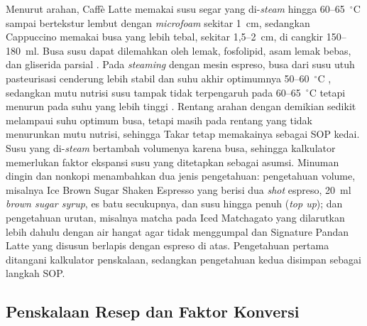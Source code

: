 Menurut arahan, Caffè Latte memakai susu segar yang di-\textit{steam} hingga 60--65~$^\circ$C sampai bertekstur lembut dengan \textit{microfoam} sekitar 1~cm, sedangkan Cappuccino memakai busa yang lebih tebal, sekitar 1,5--2~cm, di cangkir 150--180~ml. Busa susu dapat dilemahkan oleh lemak, fosfolipid, asam lemak bebas, dan gliserida parsial \citep*{huppertz2010foaming}. Pada \textit{steaming} dengan mesin espreso, busa dari susu utuh pasteurisasi cenderung lebih stabil dan suhu akhir optimumnya 50--60~$^\circ$C \citep{klimanova2022effect}, sedangkan mutu nutrisi susu tampak tidak terpengaruh pada 60--65~$^\circ$C tetapi menurun pada suhu yang lebih tinggi \citep{santini2023effects}. Rentang arahan dengan demikian sedikit melampaui suhu optimum busa, tetapi masih pada rentang yang tidak menurunkan mutu nutrisi, sehingga Takar tetap memakainya sebagai SOP kedai. Susu yang di-\textit{steam} bertambah volumenya karena busa, sehingga kalkulator memerlukan faktor ekspansi susu yang ditetapkan sebagai asumsi. Minuman dingin dan nonkopi menambahkan dua jenis pengetahuan: pengetahuan volume, misalnya Ice Brown Sugar Shaken Espresso yang berisi dua \textit{shot} espreso, 20~ml \textit{brown sugar syrup}, es batu secukupnya, dan susu hingga penuh (\textit{top up}); dan pengetahuan urutan, misalnya matcha pada Iced Matchagato yang dilarutkan lebih dahulu dengan air hangat agar tidak menggumpal dan Signature Pandan Latte yang disusun berlapis dengan espreso di atas. Pengetahuan pertama ditangani kalkulator penskalaan, sedangkan pengetahuan kedua disimpan sebagai langkah SOP.

\subsection{Penskalaan Resep dan Faktor Konversi}
\label{subsec:penskalaan}

